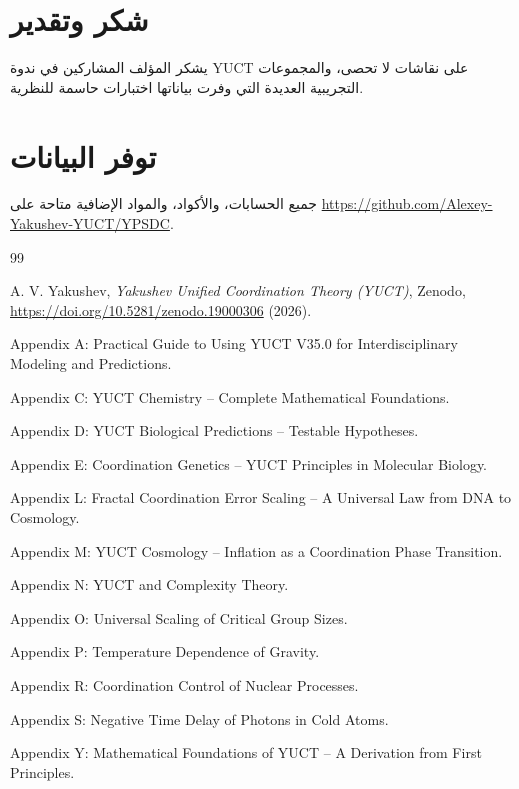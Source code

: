 \documentclass[11pt,a4paper]{article}
\begin{document}
	\section*{شكر وتقدير}
	
	يشكر المؤلف المشاركين في ندوة YUCT على نقاشات لا تحصى، والمجموعات التجريبية العديدة التي وفرت بياناتها اختبارات حاسمة للنظرية.
	
	\section*{توفر البيانات}
	
	جميع الحسابات، والأكواد، والمواد الإضافية متاحة على \url{https://github.com/Alexey-Yakushev-YUCT/YPSDC}.
	
	\begin{thebibliography}{99}
		
		A. V. Yakushev, \emph{Yakushev Unified Coordination Theory (YUCT)}, Zenodo, \url{https://doi.org/10.5281/zenodo.19000306} (2026).
		
		Appendix A: Practical Guide to Using YUCT V35.0 for Interdisciplinary Modeling and Predictions.
		
		Appendix C: YUCT Chemistry -- Complete Mathematical Foundations.
		
		Appendix D: YUCT Biological Predictions -- Testable Hypotheses.
		
		Appendix E: Coordination Genetics -- YUCT Principles in Molecular Biology.
		
		Appendix L: Fractal Coordination Error Scaling -- A Universal Law from DNA to Cosmology.
		
		Appendix M: YUCT Cosmology -- Inflation as a Coordination Phase Transition.
		
		Appendix N: YUCT and Complexity Theory.
		
		Appendix O: Universal Scaling of Critical Group Sizes.
		
		Appendix P: Temperature Dependence of Gravity.
		
		Appendix R: Coordination Control of Nuclear Processes.
		
		Appendix S: Negative Time Delay of Photons in Cold Atoms.
		
		Appendix Y: Mathematical Foundations of YUCT -- A Derivation from First Principles.
		

\end{thebibliography}
\end{document}
